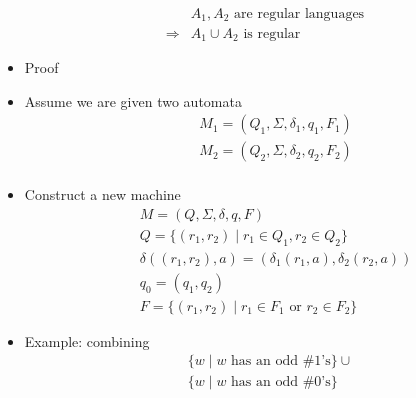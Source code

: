 \begin{frame}[allowframebreaks]
\begin{itemize}
  \begin{equation*}
    \begin{split}
&    A_1, A_2 \text{ are regular languages} \\
\Rightarrow & A_1 \cup A_2 \text{ is regular}
  \end{split}
\end{equation*}

\item Proof
\item [] Assume we are given two automata
  \begin{eqnarray*}
&& M_1 =(Q_1, \Sigma, \delta_1, q_1, F_1)\\
&& M_2 =(Q_2, \Sigma, \delta_2, q_2, F_2)\\
  \end{eqnarray*}
\item Construct a new machine
  \begin{eqnarray*}
&& M =(Q, \Sigma, \delta, q, F)\\
&& Q=\{(r_1,r_2)\mid r_1 \in Q_1, r_2 \in Q_2\}\\
&& \delta((r_1,r_2),a)=(\delta_1(r_1,a), \delta_2(r_2,a))\\
&& q_0 = (q_1,q_2)\\
&& F=\{(r_1, r_2) \mid r_1 \in F_1 
\text{ or } r_2 \in F_2\}
  \end{eqnarray*}
\item Example: combining
  \begin{equation*}
    \begin{split}
      & \{ w \mid w \text{ has an odd \# 1's} \} \cup \\
      & \{ w \mid w \text{ has an odd \# 0's} \}
\end{split}
\end{equation*}
\begin{center}


\end{center}
\end{itemize}
\end{frame}
